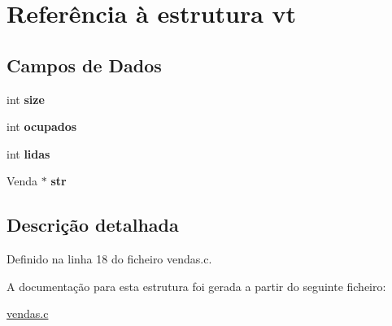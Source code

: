 \hypertarget{structvt}{}\section{Referência à estrutura vt}
\label{structvt}
\subsection*{Campos de Dados}
\begin{DoxyCompactItemize}
\item 
\mbox{\label{structvt_a7c75b73cdfe0409780710641680ada56}} 
int {\bfseries size}
\item 
\mbox{\label{structvt_a84ca9dd32424d994897b1eee0ca9d672}} 
int {\bfseries ocupados}
\item 
\mbox{\label{structvt_aa81d3e2f691fd8892303b35aac1a9e97}} 
int {\bfseries lidas}
\item 
\mbox{\label{structvt_a989d4dcb38eed0d716626f52a972af08}} 
Venda $\ast$ {\bfseries str}
\end{DoxyCompactItemize}


\subsection{Descrição detalhada}


Definido na linha 18 do ficheiro vendas.\+c.



A documentação para esta estrutura foi gerada a partir do seguinte ficheiro\+:\begin{DoxyCompactItemize}
\item 
\hyperlink{vendas_8c}{vendas.\+c}\end{DoxyCompactItemize}

